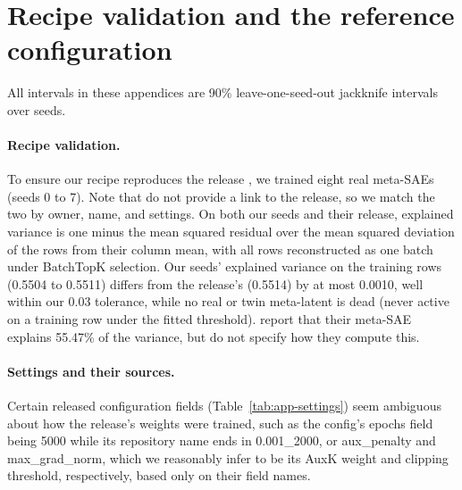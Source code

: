 \section{Recipe validation and the reference configuration}
All intervals in these appendices are 90\% leave-one-seed-out jackknife intervals over seeds.

\paragraph{Recipe validation.}
To ensure our recipe reproduces the release \citep{leask2024metasaerelease}, we trained eight real meta-SAEs (seeds 0 to 7).
Note that \citet{leask2025canonical} do not provide a link to the release, so we match the two by owner, name, and settings.
On both our seeds and their release, explained variance is one minus the mean squared residual over the mean squared deviation of the rows from their column mean, with all rows reconstructed as one batch under BatchTopK selection.
Our seeds' explained variance on the training rows (0.5504 to 0.5511) differs from the release's (0.5514) by at most 0.0010, well within our 0.03 tolerance, while no real or twin meta-latent is dead (never active on a training row under the fitted threshold).
\citet{leask2025canonical} report that their meta-SAE explains 55.47\% of the variance, but do not specify how they compute this.

\paragraph{Settings and their sources.}
Certain released configuration fields (Table~\ref{tab:app-settings}) seem ambiguous about how the release's weights were trained, such as the config's epochs field being 5000 while its repository name ends in 0.001\_2000, or aux\_penalty and max\_grad\_norm, which we reasonably infer to be its AuxK weight and clipping threshold, respectively, based only on their field names.

